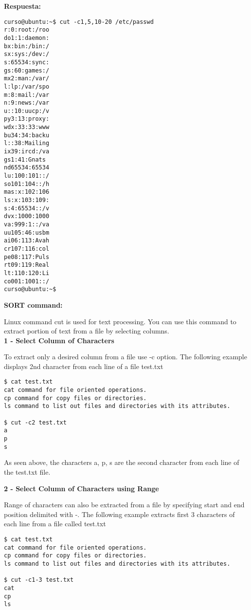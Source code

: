\documentclass[a4paper,11pt,spanish]{article} %
\newenvironment{myscriptlisting}
{\begin{list}{}{\setlength{\leftmargin}{1em}}\item\scriptsize\bfseries}
{\end{list}}
\begin{document}
\textbf{Respuesta:}

\begin{myscriptlisting}
 \begin{verbatim}
curso@ubuntu:~$ cut -c1,5,10-20 /etc/passwd
r:0:root:/roo
do1:1:daemon:
bx:bin:/bin:/
sx:sys:/dev:/
s:65534:sync:
gs:60:games:/
mx2:man:/var/
l:lp:/var/spo
m:8:mail:/var
n:9:news:/var
u::10:uucp:/v
py3:13:proxy:
wdx:33:33:www
bu34:34:backu
l::38:Mailing
ix39:ircd:/va
gs1:41:Gnats 
nd65534:65534
lu:100:101::/
so101:104::/h
mas:x:102:106
ls:x:103:109:
s:4:65534::/v
dvx:1000:1000
va:999:1::/va
uu105:46:usbm
ai06:113:Avah
cr107:116:col
pe08:117:Puls
rt09:119:Real
lt:110:120:Li
co001:1001::/
curso@ubuntu:~$ 
 \end{verbatim}
\end{myscriptlisting}

\textbf{SORT command:}

Linux command cut is used for text processing. You can use this command to
extract portion of text from a file by selecting columns.\\

\textbf{1 - Select Column of Characters}

To extract only a desired column from a file use -c option. The following
example displays 2nd character from each line of a file test.txt

\begin{myscriptlisting}
 \begin{verbatim}
$ cat test.txt
cat command for file oriented operations.
cp command for copy files or directories.
ls command to list out files and directories with its attributes.

$ cut -c2 test.txt
a
p
s
\end{verbatim}
\end{myscriptlisting}

As seen above, the characters a, p, s are the second character from each line of the test.txt file.

\textbf{2 - Select Column of Characters using Range}

Range of characters can also be extracted from a file by specifying start and 
end position delimited with -. The following example extracts first 3 characters
of each line from a file called test.txt

\begin{myscriptlisting}
 \begin{verbatim}
$ cat test.txt
cat command for file oriented operations.
cp command for copy files or directories.
ls command to list out files and directories with its attributes.

$ cut -c1-3 test.txt
cat
cp
ls
 \end{verbatim}
\end{myscriptlisting}
\end{document}
